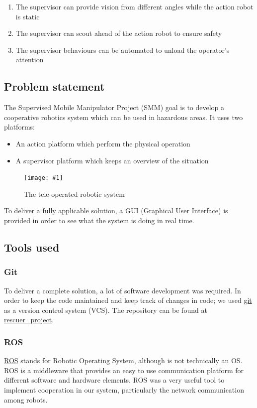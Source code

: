 \documentclass[11pt,a4paper]{article}
\newcommand{\centerFigure}[2]{
\begin{figure}[ht]	
\centering
\texttt{[image: \#1]}
\caption{#2}
\end{figure}
}
\begin{document}
\begin{enumerate}
\item The supervisor can provide vision from different angles while the action robot is static
\item The supervisor can scout ahead of the action robot to ensure safety
\item The supervisor behaviours can be automated to unload the operator's attention
\end{enumerate}


\subsection{Problem statement}
The Supervised Mobile Manipulator Project (SMM) goal is to develop a cooperative robotics
system which can be used in hazardous areas. It uses two platforms: 

\begin{itemize}
\item An action platform which perform the physical operation
\item A supervisor platform which keeps an overview of the situation
\end{itemize}

\centerFigure{teleopSystem.png}{The tele-operated robotic system}

To deliver a fully applicable solution, a GUI (Graphical User Interface) is provided in
order to see what the system is doing in real time.


\subsection{Tools used}
\subsubsection{Git}
To deliver a complete solution, a lot of software development was required. In order to keep
the code maintained and keep track of changes in code; we used \href{https://git-scm.com/}{git} as a version control system
 (VCS). The repository can be found at \href{https://github.com/axilos22/rescuer_project}{rescuer\_project}.

\subsubsection{ROS}
\href{http://www.ros.org}{ROS} stands for Robotic Operating System, although is not technically an OS. ROS is a middleware that provides an easy to use communication platform for different software and hardware elements. ROS was a very useful tool to implement cooperation in our system, particularly the network communication among robots.
\end{document}
